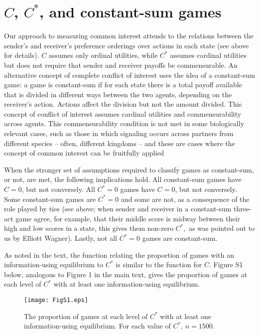 \documentclass{article}
\begin{document}

\section*{$C$, $C^*$, and constant-sum games}

Our approach to measuring common interest attends to the relations
between the sender's and receiver's preference orderings over actions
in each state (see above for details). $C$
assumes only ordinal utilities, while $C^*$ assumes cardinal utilities but
does not require that sender and receiver payoffs be commensurable.
An alternative concept of complete conflict of interest uses the idea of
a constant-sum game: a game is constant-sum if for each state there is
 a total payoff available that is divided in different ways between the
two agents, depending on the receiver's action. Actions affect
the division but not the amount divided. This concept of conflict of
interest assumes cardinal utilities and commensurability across
agents. This commensurability condition is not met in some
biologically relevant cases, such as those in which signaling occurs
across partners from different species -- often, different
kingdoms -- and these are cases where the concept of common interest
can be fruitfully applied \citep{Bergstrom2001, FitzGibbon1988, Harrison2005}

When the stronger set of assumptions required to classify
games as constant-sum, or not, are met, the following implications
hold. All constant-sum games have $C=0$, but not conversely. All $C^*=0$
games have $C=0$, but not conversely. Some constant-sum games are
$C^*=0$ and some are not, as a consequence of the role played by ties
(see above; when sender and receiver in a constant-sum three-act
game agree, for example, that their middle score is midway between
their high and low scores in a state, this gives them non-zero $C^*,$ as
was pointed out to us by Elliott Wagner). Lastly, not all $C^*=0$ games
are constant-sum.

As noted in the text, the function relating the proportion of
games with an information-using equilibrium to $C^*$ is similar to the
function for $C$. Figure S1 below, analogous to Figure 1 in the main text,
gives the proportion of games at each level of $C^*$ with at least one
 information-using equilibrium.

\begin{figure}[!ht]
\begin{center}
    \texttt{[image: FigS1.eps]}
\end{center}
\caption{The proportion of games at each level of $C^*$ with
at least one information-using equilibrium. For each value of $C^*$,
$n=1500$.}
\label{Figure_label}
\end{figure}
\end{document}
